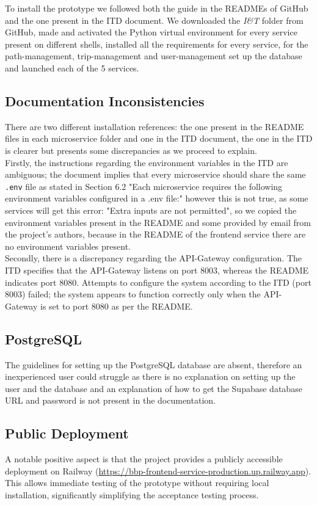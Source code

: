 \noindent
To install the prototype we followed both the guide in the READMEs of GitHub and the one present in the ITD document.
We downloaded the \textit{I\&T} folder from GitHub, made and activated the Python virtual environment for every service present on different shells, installed all the requirements for every service, for the path-management, trip-management and user-management set up the database and launched each of the 5 services.

\subsection{Documentation Inconsistencies}
There are two different installation references: the one present in the README files in each microservice folder and one in the ITD document, the one in the ITD is clearer but presents some discrepancies as we proceed to explain. \\
Firstly, the instructions regarding the environment variables in the ITD are ambiguous; the document implies that every microservice should share the same \texttt{.env} file as stated in Section 6.2 "Each microservice requires the following environment variables configured in a .env file:" however this is not true, as some services will get this error: "Extra inputs are not permitted", so we copied the environment variables present in the README and some provided by email from the project's authors, because in the README of the frontend service there are no environment variables present. \\
Secondly, there is a discrepancy regarding the API-Gateway configuration. The ITD specifies that the API-Gateway listens on port 8003, whereas the README indicates port 8080. Attempts to configure the system according to the ITD (port 8003) failed; the system appears to function correctly only when the API-Gateway is set to port 8080 as per the README.

\subsection{PostgreSQL}
The guidelines for setting up the PostgreSQL database are absent, therefore an inexperienced user could struggle as there is no explanation on setting up the user and the database and an explanation of how to get the Supabase database URL and password is not present in the documentation.

\subsection{Public Deployment}
A notable positive aspect is that the project provides a publicly accessible deployment on Railway (\url{https://bbp-frontend-service-production.up.railway.app}). This allows immediate testing of the prototype without requiring local installation, significantly simplifying the acceptance testing process.